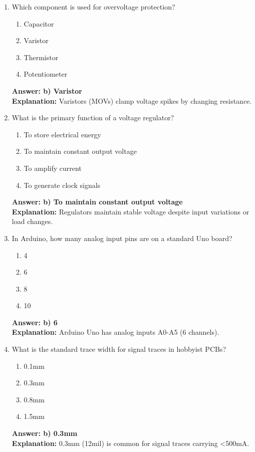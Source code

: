 \documentclass{article}
\begin{document}
\begin{enumerate}
		\item Which component is used for overvoltage protection?
		\begin{enumerate}
			\item Capacitor
			\item Varistor
			\item Thermistor
			\item Potentiometer
		\end{enumerate}
		\textbf{Answer: b) Varistor} \\
		\textbf{Explanation:} Varistors (MOVs) clamp voltage spikes by changing resistance.
		
		\item What is the primary function of a voltage regulator?
		\begin{enumerate}
			\item To store electrical energy
			\item To maintain constant output voltage
			\item To amplify current
			\item To generate clock signals
		\end{enumerate}
		\textbf{Answer: b) To maintain constant output voltage} \\
		\textbf{Explanation:} Regulators maintain stable voltage despite input variations or load changes.
		
		\item In Arduino, how many analog input pins are on a standard Uno board?
		\begin{enumerate}
			\item 4
			\item 6
			\item 8
			\item 10
		\end{enumerate}
		\textbf{Answer: b) 6} \\
		\textbf{Explanation:} Arduino Uno has analog inputs A0-A5 (6 channels).
		
		\item What is the standard trace width for signal traces in hobbyist PCBs?
		\begin{enumerate}
			\item 0.1mm
			\item 0.3mm
			\item 0.8mm
			\item 1.5mm
		\end{enumerate}
		\textbf{Answer: b) 0.3mm} \\
		\textbf{Explanation:} 0.3mm (12mil) is common for signal traces carrying <500mA.
		

\end{enumerate}
\end{document}
